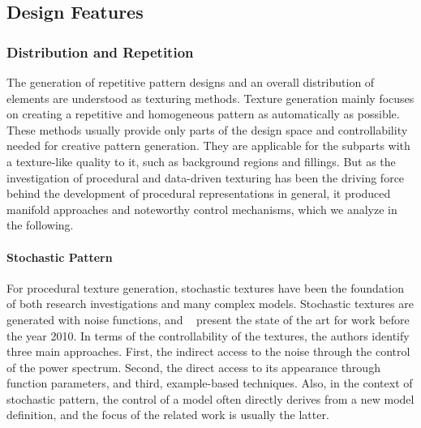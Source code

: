 \subsection{Design Features}
\label{subsec:analysis_design_features}


\subsubsection{Distribution and Repetition}
\label{subsec:analysis_distribution_and_repetition}


The generation of repetitive pattern designs and an overall distribution of elements are understood as texturing methods. Texture generation mainly focuses on creating a repetitive and homogeneous pattern as automatically as possible. These methods usually provide only parts of the design space and controllability needed for creative pattern generation. They are applicable for the subparts with a texture-like quality to it, such as background regions and fillings. But as the investigation of procedural and data-driven texturing has been the driving force behind the development of procedural representations in general, it produced manifold approaches and noteworthy control mechanisms, which we analyze in the following.



\paragraph{Stochastic Pattern}
\label{para:analysis_distribution_and_repetition_stochastic}

For procedural texture generation, stochastic textures have been the foundation of both research investigations and many complex models. Stochastic textures are generated with noise functions, and \citeauthor*{lagae_2010_sap}~\cite{lagae_2010_sap} present the state of the art for work before the year 2010. In terms of the controllability of the textures, the authors identify three main approaches. First, the indirect access to the noise through the control of the power spectrum. Second, the direct access to its appearance through function parameters, and 
third, example-based techniques. Also, in the context of stochastic pattern, the control of a model often directly derives from a new model definition, and the focus of the related work is usually the latter.

